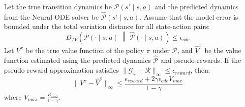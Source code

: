 \documentclass[manuscript, screen, review]{jair}
\begin{document}
\begin{theorem}\label{thm:value_error_bound}
Let the true transition dynamics be $\mathcal{P}(s' \mid s, a)$ and the predicted dynamics from the Neural ODE solver be $\hat{\mathcal{P}}(s' \mid s, a)$. Assume that the model error is bounded under the total variation distance for all state-action pairs:
\begin{equation}
    D_{TV}\left( \mathcal{P}(\cdot \mid s, a) \;\middle\|\; \hat{\mathcal{P}}(\cdot \mid s, a) \right) \le \epsilon_{ode}
\end{equation}
Let $V^\pi$ be the true value function of the policy $\pi$ under $\mathcal{P}$, and $\hat{V}^\pi$ be the value function estimated using the predicted dynamics $\hat{\mathcal{P}}$ and pseudo-rewards. If the pseudo-reward approximation satisfies $\|\mathcal{G}_\psi - \mathcal{R}\|_\infty \le \epsilon_{reward}$, then:
\begin{equation}
    \| V^\pi - \hat{V}^\pi \|_\infty \le \frac{\epsilon_{reward} + 2 \gamma \epsilon_{ode} V_{max}}{1 - \gamma}
\end{equation}
where $V_{max} = \frac{R_{max}}{1-\gamma}$.
\end{theorem}
\end{document}
